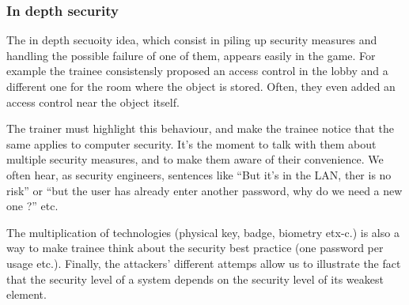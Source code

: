 \documentclass[11pt]{article} %
\begin{document}

\subsubsection{In depth security}
The in depth secuoity idea, which consist in piling up security measures and 
handling the possible failure of one of them, appears easily in the game. 
For example the trainee consistensly proposed an access control in the lobby
and a different one for the room where the object is stored. Often, they 
even added an access control near the object itself.

The trainer must highlight this behaviour, and make the trainee notice that the 
same applies to computer security. It's the moment to talk with them about multiple 
security measures, and to make them aware of their convenience. We often hear, 
as security engineers, sentences like ``But it's in the LAN, ther is no risk'' or 
``but the user has already enter another password, why do we need a new one ?'' etc.

The multiplication of technologies (physical key, badge, biometry etx-c.) is also a way 
to make trainee think about the security best practice (one password per usage etc.).
Finally, the attackers' different attemps allow us to illustrate the fact that the security level
of a system depends on the security level of its weakest element.
\end{document}
